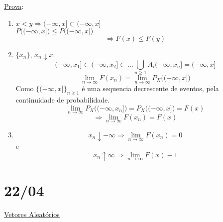 \documentclass[a4paper,12pt]{article}
\begin{document}
\underline{Prova}:\\
\begin{enumerate}[label=\roman*)]
	\item $x<y \Rightarrow (-\infty,x]\subset (-\infty,x]$\\
	 $ P\bigg((-\infty,x]\bigg)\le P\bigg((-\infty,x]\bigg)$\\
	 $$\Rightarrow F(x)\le F(y) $$
	  \item $\{x_n\} $, $x_n \downarrow x $
	  $$(-\infty,x_1]\subset (-\infty,x_2]\subset\ldots \bigcup\limits_{n\ge 1}A_i(-\infty,x_n]= (-\infty,x] $$
	  $$\lim\limits_{n\rightarrow \infty} F(x_n)= \lim\limits_{n\rightarrow \infty} P_X\bigg((-\infty,x] \bigg) $$
	  Como $\{(-\infty,x]\}_{n\ge 1}$ é uma sequencia decrescente de eventos, pela continuidade de probabilidade.
	  $$\lim\limits_{n\rightarrow \infty} P_X\bigg((-\infty,x_n] \bigg) = P_X\bigg((-\infty,x] \bigg)=F(x) $$
	  $$\Rightarrow \lim\limits_{n\rightarrow \infty} F(x_n)=F(x) $$
	  
	  \item $$x_n\downarrow-\infty \Rightarrow \lim\limits_{n\rightarrow \infty} F(x_n)=0 $$
	  e 
	  $$x_n\uparrow \infty \Rightarrow \lim\limits_{n\rightarrow \infty}  F(x)-1 $$

\end{enumerate}
\newpage

\section{22/04}

\underline{Vetores Aleatórios}\\
\\
\end{document}
